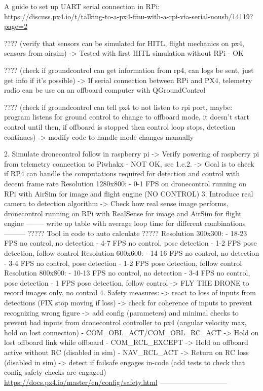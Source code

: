         A guide to set up UART serial connection in RPi: \url{https://discuss.px4.io/t/talking-to-a-px4-fmu-with-a-rpi-via-serial-nousb/14119?page=2}
    
        ???? (verify that sensors can be simulated for HITL, flight mechanics on px4, sensors from airsim) -> Tested with first HITL simulation without RPi - OK
        
        ???? (check if groundcontrol can get information from rp4, can logs be sent, just get info if it's possible) -> If serial connection between RPi and PX4, telemetry radio can be use on an offboard computer with QGroundControl
        
        ???? (check if groundcontrol can tell px4 to not listen to rpi port,
        maybe: program listens for ground control to change to offboard mode, it doesn't start control until then, if offboard is stopped then control loop stops, detection continues)
        -> modify code to handle mode changes manually
        
2. Simulate dronecontrol follow in raspberry pi
    -> Verify powering of raspberry pi from telemetry connection to Piwhakx - NOT OK, see 1.c.2.
    -> Goal is to check if RP4 can handle the computations required for detection and control with decent frame rate
    Resolution 1280x800:
        - 0-1 FPS on dronecontrol running on RPi with AirSim for image and flight engine (NO CONTROL)
3. Introduce real camera to detection algorithm
    -> Check how real sense image performs, dronecontrol running on RPi with RealSense for image and AirSim for flight engine
    -------- write up table with average loop time for different combinations  ---------
    ????? Tool in code to auto calculate ?????
    Resolution 300x300:
        - 18-23 FPS no control, no detection
        - 4-7 FPS no control, pose detection
        - 1-2 FPS pose detection, follow control
    Resolution 600x600:
        - 14-16 FPS no control, no detection
        - 3-4 FPS no control, pose detection
        - 1-2 FPS pose detection, follow control
    Resolution 800x800:
        - 10-13 FPS no control, no detection
        - 3-4 FPS no control, pose detection
        - 1 FPS pose detection, follow control
    -> FLY THE DRONE to record images only, no control
4. Safety measures: 
    -> react to loss of inputs from detections (FIX stop moving if loss)
    -> check for coherence of inputs to prevent recognizing wrong figure
    -> add config (parameters) and minimal checks to prevent bad inputs from dronecontrol controller to px4 (angular velocity max, hold on lost connection) 
            - COM_OBL_ACT/COM_OBL_RC_ACT -> Hold on lost offboard link while offboard
            - COM_RCL_EXCEPT -> Hold on offboard active without RC (disabled in sim)
            - NAV_RCL_ACT -> Return on RC loss (disabled in sim)
    -> detect if failsafe engages in-code (add tests to check that config safety checks are engaged)
    \url{https://docs.px4.io/master/en/config/safety.html}
    -----------------------------
    
